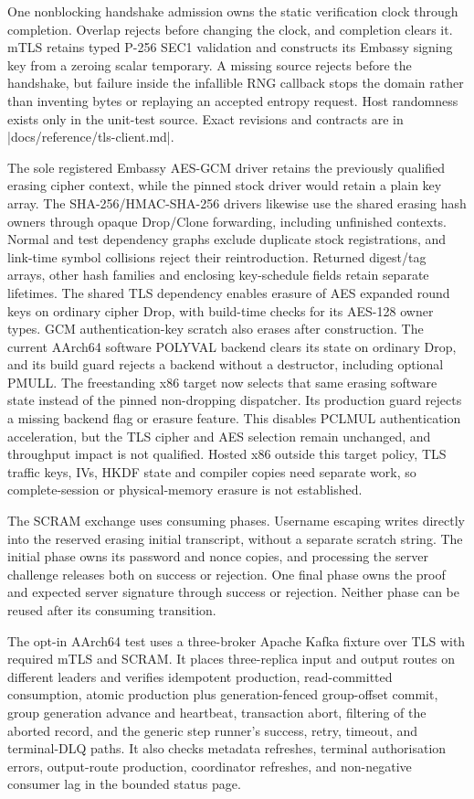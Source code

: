 One nonblocking handshake admission owns the static verification clock through
completion. Overlap rejects before changing the clock, and completion clears
it. mTLS retains typed P-256 SEC1 validation and constructs its Embassy signing
key from a zeroing scalar temporary. A missing source rejects before the
handshake, but failure inside the infallible RNG callback stops the domain rather
than inventing bytes or replaying an accepted entropy request. Host randomness
exists only in the unit-test source. Exact revisions and contracts are in
\repofile|docs/reference/tls-client.md|.

The sole registered Embassy AES-GCM driver retains the previously qualified
erasing cipher context, while the pinned stock driver would retain a plain key array.
The SHA-256/HMAC-SHA-256 drivers likewise use the shared erasing hash owners
through opaque Drop/Clone forwarding, including unfinished contexts. Normal and
test dependency graphs exclude duplicate stock registrations, and link-time symbol
collisions reject their reintroduction. Returned digest/tag arrays, other hash
families and enclosing key-schedule fields retain separate lifetimes.
The shared TLS dependency enables erasure of AES expanded round keys on
ordinary cipher Drop, with build-time checks for its AES-128 owner types.
GCM authentication-key scratch also erases after construction. The current
AArch64 software POLYVAL backend clears its state on ordinary Drop, and its build
guard rejects a backend without a destructor, including optional PMULL. The
freestanding x86 target now selects that same erasing software state instead of
the pinned non-dropping dispatcher. Its production guard rejects a missing
backend flag or erasure feature. This disables PCLMUL authentication acceleration, but
the TLS cipher and AES selection remain unchanged, and throughput impact is not
qualified. Hosted x86 outside this target policy, TLS traffic keys, IVs, HKDF
state and compiler copies need separate work, so complete-session or physical-memory
erasure is not established.

The SCRAM exchange uses consuming phases. Username escaping writes directly into
the reserved erasing initial transcript, without a separate scratch string. The
initial phase owns its password and nonce copies, and processing the server challenge
releases both on success or rejection. One final phase owns the proof and
expected server signature through success or rejection. Neither phase can
be reused after its consuming transition.

The opt-in AArch64 test uses a three-broker Apache Kafka fixture over TLS with
required mTLS and SCRAM. It places three-replica input and output routes on
different leaders and verifies idempotent production, read-committed
consumption, atomic production plus
generation-fenced group-offset commit, group generation advance and heartbeat,
transaction abort, filtering of the aborted record, and
the generic step runner's success, retry, timeout, and terminal-DLQ paths. It
also checks metadata refreshes, terminal authorisation errors, output-route
production, coordinator refreshes, and non-negative consumer lag in the
bounded status page.

